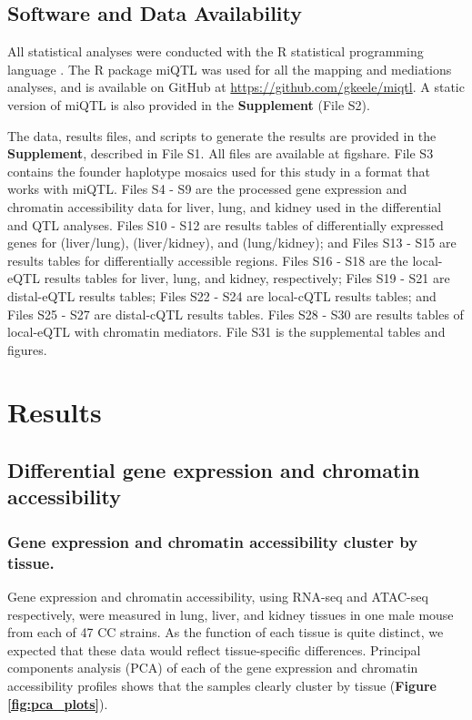\documentclass[9pt,twocolumn,twoside]{gsajnl}
\newcommand{\WV}[2]{\textcolor{red}{#1\footnote{\textcolor{red}{WV: #2}}}}
\newcommand{\WVinline}[1]{\textcolor{red}{#1}}
\begin{document}
\subsection{Software and Data Availability}

All statistical analyses were conducted with the R statistical programming language \citep{RSoftware2019}. The R package miQTL was used for all the mapping and mediations analyses, and is available on GitHub at \url{https://github.com/gkeele/miqtl}. A static version of miQTL is also provided in the \textbf{Supplement} (File S2).

The data, results files, and scripts to generate the results are provided in the \textbf{Supplement}, described in File S1. All files are available at figshare. File S3 contains the founder haplotype mosaics used for this study in a format that works with miQTL. Files S4 - S9 are the processed gene expression and chromatin accessibility data for liver, lung, and kidney used in the differential and QTL analyses. Files S10 - S12 are results tables of differentially expressed genes for (liver/lung), (liver/kidney), and (lung/kidney); and Files S13 - S15 are results tables for differentially accessible regions. Files S16 - S18 are the local-eQTL results tables for liver, lung, and kidney, respectively; Files S19 - S21 are distal-eQTL results tables; Files S22 - S24 are local-cQTL results tables; and Files S25 - S27 are distal-cQTL results tables. Files S28 - S30 are results tables of local-eQTL with chromatin mediators. File S31 is the supplemental tables and figures.

\section{Results}


\subsection{Differential gene expression and chromatin accessibility} %

\subsubsection{Gene expression and chromatin accessibility cluster by tissue.}
Gene expression and chromatin accessibility, using RNA-seq and ATAC-seq respectively, were measured in lung, liver, and kidney tissues in one male mouse from each of 47 CC strains. As the function of each tissue is quite distinct, we expected that these data would reflect tissue-specific differences. Principal components analysis (PCA) of each of the gene expression and chromatin accessibility profiles shows that the samples clearly cluster by tissue (\textbf{Figure \ref{fig:pca_plots}}). 
\end{document}
